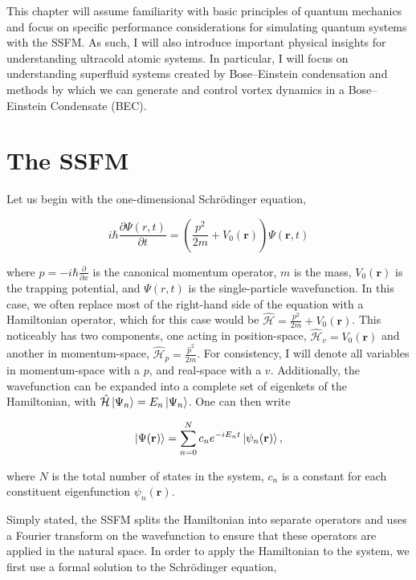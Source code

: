 This chapter will assume familiarity with basic principles of quantum mechanics and focus on specific performance considerations for simulating quantum systems with the SSFM.
As such, I will also introduce important physical insights for understanding ultracold atomic systems.
In particular, I will focus on understanding superfluid systems created by Bose--Einstein condensation and methods by which we can generate and control vortex dynamics in a Bose--Einstein Condensate (BEC).


\section{The SSFM}
Let us begin with the one-dimensional Schr\"odinger equation,

\begin{equation}
i\hbar \frac{\partial \Psi(r, t)}{\partial t} = \left(\frac{p^2}{2m} + V_0(\mathbf{r}) \right)\Psi(\mathbf{r},t)
\label{eqn:schrody}
\end{equation}

\noindent where $\hat p = -i\hbar\frac{\partial}{\partial x}$ is the canonical momentum operator, $m$ is the mass, $V_0(\mathbf{r})$ is the trapping potential, and $\Psi(r,t)$ is the single-particle wavefunction.
In this case, we often replace most of the right-hand side of the equation with a Hamiltonian operator, which for this case would be $\mathcal{\hat H} = \frac{p^2}{2m} + V_0(\mathbf{r})$.
This noticeably has two components, one acting in position-space, $\mathcal{\hat H}_v = V_0(\mathbf{r})$ and another in momentum-space, $\mathcal{\hat H}_p = \frac{\hat p^2}{2m}$.
For consistency, I will denote all variables in momentum-space with a $p$, and real-space with a $v$.
Additionally, the wavefunction can be expanded into a complete set of eigenkets of the Hamiltonian, with $\mathcal{\hat H}\ket{\Psi_n} = E_n\ket{\Psi_n}$.
One can then write

\begin{equation}
\ket{\Psi(\mathbf{r})} = \sum_{n=0}^N c_n e^{-iE_nt}\ket{\psi_n(\mathbf{r})},
\end{equation}

\noindent where $N$ is the total number of states in the system, $c_n$ is a constant for each constituent eigenfunction $\psi_n(\mathbf{r})$.

Simply stated, the SSFM splits the Hamiltonian into separate operators and uses a Fourier transform on the wavefunction to ensure that these operators are applied in the natural space.
In order to apply the Hamiltonian to the system, we first use a formal solution to the Schr\"odinger equation,


